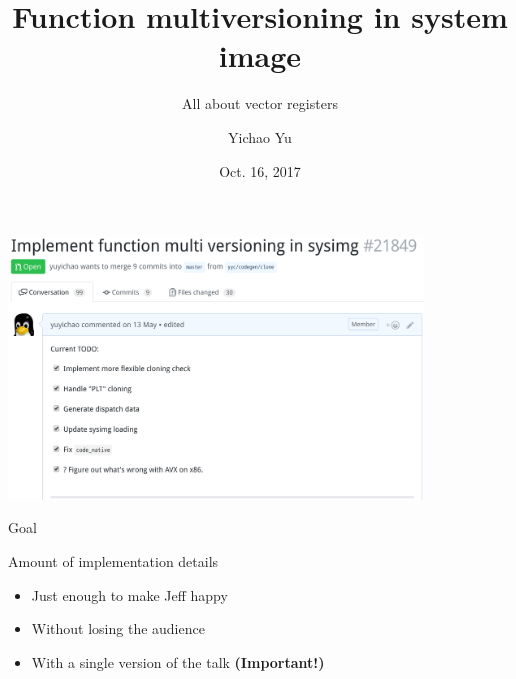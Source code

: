\documentclass{beamer}
\title{Function multiversioning in system image}
\subtitle{All about vector registers}
\date{Oct. 16, 2017}
\author{Yichao Yu}
\institute{Harvard}
\begin{document}
\begin{frame}{}
  \titlepage
\end{frame}

\begin{frame}{}
  \begin{center}
    \includegraphics[width=11cm]{imgs/pr21849.png}
  \end{center}
\end{frame}




\begin{frame}{Goal}
  \visible<+-> {
    \begin{block}{Amount of implementation details}
      \begin{itemize}
      \item<+-> Just enough to make Jeff happy
      \item<+-> Without losing the audience
      \item<+-> With a single version of the talk \textbf{(Important!)}
      \end{itemize}
    \end{block}
  }
\end{frame}


\end{document}
